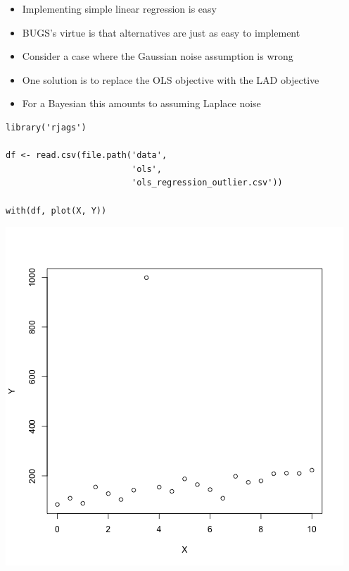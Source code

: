 \documentclass{beamer}
\begin{document}
\begin{frame}[fragile]
  \begin{itemize}
    \item{Implementing simple linear regression is easy}
    \item{BUGS's virtue is that alternatives are just as easy to implement}
  \end{itemize}
\end{frame}

\begin{frame}[fragile]
  \begin{itemize}
    \item{Consider a case where the Gaussian noise assumption is wrong}
    \item{One solution is to replace the OLS objective with the LAD objective}
    \item{For a Bayesian this amounts to assuming Laplace noise}
  \end{itemize}
\end{frame}

\begin{frame}[fragile]
  \begin{verbatim}
library('rjags')

df <- read.csv(file.path('data',
                         'ols',
                         'ols_regression_outlier.csv'))

with(df, plot(X, Y))
  \end{verbatim}
\end{frame}

\begin{frame}[fragile]
  \begin{center}
    \includegraphics[scale = 0.4]{../graphs/ols/outlier_data_plot.png}
  \end{center}
\end{frame}
\end{document}
